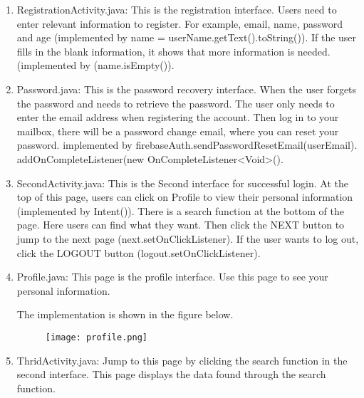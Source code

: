 \documentclass[conference]{IEEEtran}
\begin{document}
\begin{enumerate}
\begin{enumerate}
        \item RegistrationActivity.java:
        This is the registration interface. Users need to enter relevant information to register. For example, email, name, password and age (implemented by name = userName.getText().toString()). If the user fills in the blank information, it shows that more information is needed.(implemented by (name.isEmpty()).\vspace{1\baselineskip}
        
        \item Password.java:
        This is the password recovery interface. When the user forgets the password and needs to retrieve the password. The user only needs to enter the email address when registering the account. Then log in to your mailbox, there will be a password change email, where you can reset your password. implemented by firebaseAuth.sendPasswordResetEmail(userEmail).
        addOnCompleteListener(new OnCompleteListener<Void>().\vspace{1\baselineskip}
        
        \item SecondActivity.java: 
        This is the Second interface for successful login. At the top of this page, users can click on Profile to view their personal information (implemented by Intent()). There is a search function at the bottom of the page. Here users can find what they want. Then click the NEXT button to jump to the next page (next.setOnClickListener). If the user wants to log out, click the LOGOUT button (logout.setOnClickListener).\vspace{1\baselineskip}
        
        \item Profile.java: 
        This page is the profile interface. Use this page to see your personal information.
        \vspace{1\baselineskip}
        
        The implementation is shown in the figure below.
        
        \begin{figure}[h]
        \begin{center}
        \centering
        \texttt{[image: profile.png]}
        \caption{}
        \label{fig:my_label}
        \end{center}
        \end{figure}
        
        \item ThridActivity.java:
        Jump to this page by clicking the search function in the second interface. This page displays the data found through the search function.
        \vspace{1\baselineskip}
        

\end{enumerate}
\end{enumerate}
\end{document}
